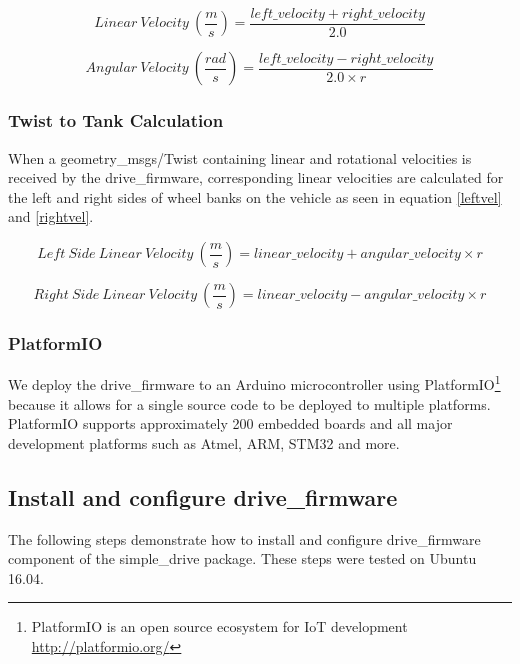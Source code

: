 \documentclass[runningheads,a4paper]{llncs}
\begin{document}
\begin{equation}\label{linvel}
Linear\ Velocity\ (\frac{m}{s})=\frac{left\_velocity + right\_velocity}{2.0}
\end{equation}

\begin{equation}\label{angvel}
Angular\ Velocity\ (\frac{rad}{s})=\frac{left\_velocity - right\_velocity}{2.0 \times r}
\end{equation}

\subsubsection*{Twist to Tank Calculation}

When a geometry\_msgs/Twist containing linear and rotational velocities is received by the drive\_firmware, corresponding linear velocities are calculated for the left and right sides of wheel banks on the vehicle as seen in equation \ref{leftvel} and \ref{rightvel}.

\begin{equation}\label{leftvel}
Left\ Side\ Linear\ Velocity\ (\frac{m}{s})=linear\_velocity + angular\_velocity \times r
\end{equation}

\begin{equation}\label{rightvel}
Right\ Side\ Linear\ Velocity\ (\frac{m}{s})=linear\_velocity - angular\_velocity \times r
\end{equation}

\subsubsection*{PlatformIO} We deploy the drive\_firmware to an Arduino microcontroller using PlatformIO\footnote{PlatformIO is an open source ecosystem for IoT development \url{http://platformio.org/}} because it allows for a single source code to be deployed to multiple platforms. PlatformIO supports approximately 200 embedded boards and all major development platforms such as Atmel, ARM, STM32 and more.

\subsection{Install and configure drive\_firmware}

The following steps demonstrate how to install and configure drive\_firmware component of the simple\_drive package. These steps were tested on Ubuntu 16.04.
\end{document}
